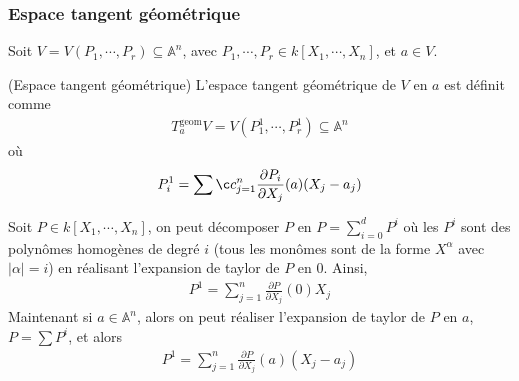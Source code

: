             \subsubsection{Espace tangent géométrique}
                Soit $V = V(P_1, \cdots, P_r) \subseteq \mathbb{A}^n$, avec $P_1, \cdots, P_r \in k[X_1, \cdots, X_n]$, et $a \in V$.
                \begin{defi} (Espace tangent géométrique)
                    L'espace tangent géométrique de $V$ en $a$ est définit comme
                    \begin{align*}
                        T_a^\mathrm{geom} V = V(P^1_1, \cdots, P_r^1) \subseteq \mathbb{A}^n
                    \end{align*}
                    où 
                    \begin{align*}
                        P_i^1 = \sumç_{j = 1}^n \frac{\partial P_i}{\partial X_j}(a) (X_j - a_j)
                    \end{align*}
                \end{defi}
                \begin{remq}
                    Soit $P \in k[X_1, \cdots, X_n]$, on peut décomposer $P$ en $P = \sum_{i = 0}^d P^i$ où les $P^i$ sont des polynômes homogènes de degré $i$ (tous les monômes sont de la forme $X^\alpha$ avec $|\alpha| = i$) en réalisant l'expansion de taylor de $P$ en $0$. Ainsi, 
                    \begin{align*}
                        P^1 = \sum_{j = 1}^n \frac{\partial P}{\partial X_j}(0) X_j
                    \end{align*}
                    Maintenant si $a \in \mathbb{A}^n$, alors on peut réaliser l'expansion de taylor de $P$ en $a$, $P = \sum P^i$, et alors
                    \begin{align*}
                        P^1 = \sum_{j = 1}^n \frac{\partial P}{\partial X_j}(a) (X_j - a_j)
                    \end{align*}
                \end{remq}
